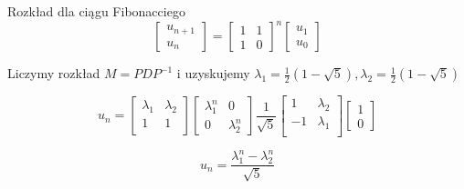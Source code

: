 \documentclass[handout]{beamer}
\theoremstyle{definition}
\theoremstyle{named}
\begin{document}
\begin{frame}{Rozkład dla ciągu Fibonacciego}
    \begin{equation}
        \begin{bmatrix}
        u_{n+1} \\
        u_{n}
        \end{bmatrix}
        = 
        \begin{bmatrix}
        1 & 1\\
        1 & 0
        \end{bmatrix}^n
        \begin{bmatrix}
        u_1 \\
        u_0 
        \end{bmatrix}
    \end{equation}
    \pause
    
    Liczymy rozkład $M = PDP^{-1}$ i uzyskujemy $\lambda_1 =  \frac{1}{2} \left(1-\sqrt{5}\right), \lambda_2 = \frac{1}{2} \left(1-\sqrt{5}\right) $

\pause
    \newline
    \begin{equation}
         u_n = 
        \begin{bmatrix}
            \lambda_1 & \lambda_2 \\
         1 & 1 \\
        \end{bmatrix}
        \begin{bmatrix}
           \lambda_1^{n} & 0 \\
            0 & \lambda_2^{n}
        \end{bmatrix}
        \frac{1}{\sqrt{5}}
        \begin{bmatrix}
           1 & \lambda_2 \\
           -1  & \lambda_1 \\
        \end{bmatrix} 
        \begin{bmatrix}
           1 \\
           0
        \end{bmatrix}
    \end{equation}
    
    \pause
    \newline
    
    \begin{equation}
        u_n = \frac{\lambda_1^{n} - \lambda_2^{n}}{\sqrt{5}}
    \end{equation}
 
 
\end{frame}
\end{document}
